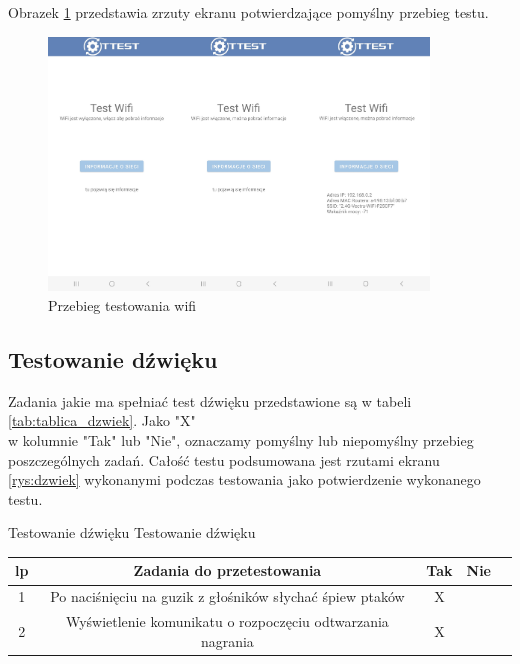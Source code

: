 Obrazek \ref{rys:wifi} przedstawia zrzuty ekranu potwierdzające pomyślny przebieg testu.

\begin{figure}[!hbt]
	\begin{center}
		\includegraphics[angle=360, width=0.90\textwidth]{rys/punkt5/wifi.png}
		\caption{Przebieg testowania wifi}
		\label{rys:wifi}
	\end{center}
\end{figure} 

\newpage


\subsection{Testowanie dźwięku}

Zadania jakie ma spełniać test dźwięku przedstawione są w tabeli \ref{tab:tablica_dzwiek}. Jako "X" \\ w kolumnie "Tak" lub "Nie", oznaczamy pomyślny lub niepomyślny przebieg poszczególnych zadań. Całość testu podsumowana jest rzutami ekranu \ref{rys:dzwiek} wykonanymi podczas testowania jako potwierdzenie wykonanego testu.

\begin{tabela}
	{Testowanie dźwięku}	%
	{Testowanie dźwięku}	%
	{
		\begin{tabular}{|c|c|c|c|c|} \hline
			\textbf{lp} & \textbf{Zadania do przetestowania} & \textbf{Tak} & \textbf{Nie} \\ \hline
			1 & Po naciśnięciu na guzik z głośników słychać śpiew ptaków & X & ~ \\ \hline
			2 & Wyświetlenie komunikatu o rozpoczęciu odtwarzania nagrania & X & ~ \\ \hline
	\end{tabular}	}
	\label{tab:tablica_dzwiek}
\end{tabela}

